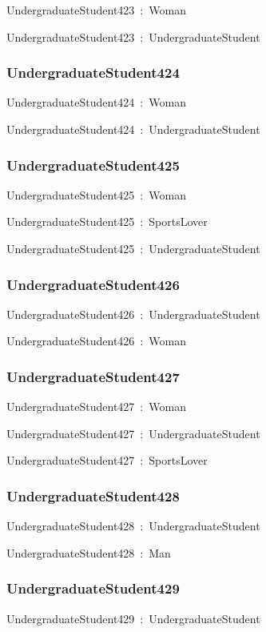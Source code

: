\documentclass{article}
\begin{document}
UndergraduateStudent423~:~Woman

UndergraduateStudent423~:~UndergraduateStudent

\subsubsection*{UndergraduateStudent424}

UndergraduateStudent424~:~Woman

UndergraduateStudent424~:~UndergraduateStudent

\subsubsection*{UndergraduateStudent425}

UndergraduateStudent425~:~Woman

UndergraduateStudent425~:~SportsLover

UndergraduateStudent425~:~UndergraduateStudent

\subsubsection*{UndergraduateStudent426}

UndergraduateStudent426~:~UndergraduateStudent

UndergraduateStudent426~:~Woman

\subsubsection*{UndergraduateStudent427}

UndergraduateStudent427~:~Woman

UndergraduateStudent427~:~UndergraduateStudent

UndergraduateStudent427~:~SportsLover

\subsubsection*{UndergraduateStudent428}

UndergraduateStudent428~:~UndergraduateStudent

UndergraduateStudent428~:~Man

\subsubsection*{UndergraduateStudent429}

UndergraduateStudent429~:~UndergraduateStudent
\end{document}
